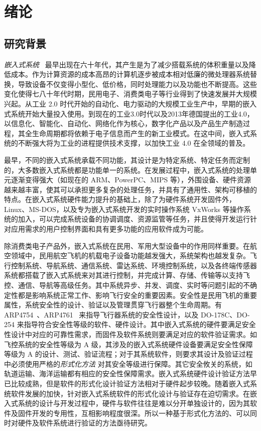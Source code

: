 \chapter{绪论}
\label{cha:intro}

\section{研究背景}

\emph{嵌入式系统}~\cite{heath2002embedded} 最早出现在六十年代，其产生是为了减少搭载系统的体积重量以及降低成本。作为计算资源的成本高昂的计算机逐步被成本相对低廉的微处理器系统替换，导致设备不仅变得小型化、低价格，同时处理能力以及功能也不断提高。这些变化使得七八十年代时期，民用电子、消费类电子等行业得到了快速发展并大规模兴起。从工业 2.0 时代开始的自动化、电力驱动的大规模工业生产中，早期的嵌入式系统开始大量投入使用。到现在的工业3.0时代以及2013年德国提出的工业4.0，以信息化、智能化、自动化、网络化作为核心，数字化产品以及产品生产制造过程，其全生命周期都将依赖于电子信息而产生的新工业模式。在这中间，嵌入式系统的不断强大将为工业的进程提供技术支撑，以加快工业 4.0 在全领域的普及。

最早，不同的嵌入式系统承载不同功能，其设计是为特定系统、特定任务而定制的，大多数嵌入式系统都是功能单一的系统。在发展过程中，嵌入式系统的处理单元逐渐变得强大（如现在的 ARM、PowerPC、MIPS 等），外围设备、硬件资源越来越丰富，使其可以承担更多复杂的处理任务，并具有了通用性、架构可移植的特点。在嵌入式系统硬件能力提升的基础上，除了为硬件系统开发固件外，Linux、MS-DOS，以及专为嵌入式系统开发的实时操作系统 VxWorks 等操作系统的加入，可以完成系统设备的协调调度、资源监管等任务，并且使得开发运行针对应用需求的用户控制界面和具有更多功能的应用软件成为可能。 

除消费类电子产品外，嵌入式系统在民用、军用大型设备中的作用同样重要。在航空领域中，民用航空飞机的机载电子设备功能越发强大，系统架构也越发复杂。飞行控制系统、导航系统、通信系统、雷达系统、环境控制系统，以及各终端传感器系统都搭载了嵌入式系统来对其进行控制，并完成计算、存储、传输等以支持飞控、通信、导航等高级任务。其中系统异步、并发、调度、实时等问题引起的不确定性都是影响系统正常工作、影响飞行安全的重要因素。安全性是民用飞机的重要属性，系统安全性的设计、验证以及管理贯穿飞行器整个生命周期。有 ARP4754~\cite{ARP4754A}、ARP4761~\cite{ARP4761} 来指导飞行器系统的安全性设计，以及 DO-178C、DO-254 来指导符合安全性等级的软件、硬件设计。其中嵌入式系统的硬件要满足安全性设计中对应的可靠性需求，而固件及软件系统则要满足对应的软件验证需求。如飞控系统的安全性等级为 A 级，其涉及的嵌入式系统硬件设备要满足安全性保障等级为 A 的设计、测试、验证流程；对于其系统软件，则要求其设计及验证过程中必须使用严格的\emph{形式化方法} 对其安全等级进行保障。其它安全攸关的系统，如轨道运输、海洋运输都有相应的安全性保障需求。嵌入式系统硬件设计验证方法早已比较成熟，但是软件的形式化设计验证方法相对于硬件起步较晚。随着嵌入式系统软件发展的加快，针对嵌入式系统软件的形式化设计与验证存在迫切需求。在嵌入式系统的设计与开发过程中，硬件与软件往往是难以分开单独设计的，因为其软件及固件开发的专用性，互相影响程度很深。所以一种基于形式化方法的、可以同时对硬件及软件系统进行验证的方法亟待研究。

